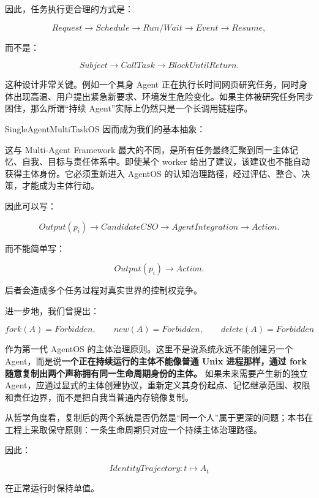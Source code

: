 因此，任务执行更合理的方式是：

\[
Request
\rightarrow
Schedule
\rightarrow
Run/Wait
\rightarrow
Event
\rightarrow
Resume,
\]

而不是：

\[
Subject
\rightarrow
CallTask
\rightarrow
BlockUntilReturn.
\]

这种设计非常关键。例如一个具身 Agent 正在执行长时间网页研究任务，同时身体出现高温、用户提出紧急新要求、环境发生危险变化。如果主体被研究任务同步困住，那么所谓“持续 Agent”实际上仍然只是一个长调用链程序。

SingleAgentMultiTaskOS 因而成为我们的基本抽象：

\begin{statementbox}
\centering
{}
\end{statementbox}

这与 Multi-Agent Framework 最大的不同，是所有任务最终汇聚到同一主体记忆、自我、目标与责任体系中。即使某个 worker 给出了建议，该建议也不能自动获得主体身份。它必须重新进入 AgentOS 的认知治理路径，经过评估、整合、决策，才能成为主体行动。

因此可以写：

\[
Output(p_i)
\rightarrow
CandidateCSO
\rightarrow
AgentIntegration
\rightarrow
Action.
\]

而不能简单写：

\[
Output(p_i)
\rightarrow
Action.
\]

后者会造成多个任务过程对真实世界的控制权竞争。

进一步地，我们曾提出：

\[
fork(A)=Forbidden,
\qquad
new(A)=Forbidden,
\qquad
delete(A)=Forbidden
\]

作为第一代 AgentOS 的主体治理原则。这里不是说系统永远不能创建另一个 Agent，而是说\textbf{一个正在持续运行的主体不能像普通 Unix 进程那样，通过 fork 随意复制出两个声称拥有同一生命周期身份的主体。} 如果未来需要产生新的独立 Agent，应通过显式的主体创建协议，重新定义其身份起点、记忆继承范围、权限和责任边界，而不是把自我当普通内存镜像复制。

从哲学角度看，复制后的两个系统是否仍然是“同一个人”属于更深的问题；本书在工程上采取保守原则：一条生命周期只对应一个持续主体治理路径。

因此：

\[
\boxed{
IdentityTrajectory
:
t\mapsto A_t
}
\]

在正常运行时保持单值。

